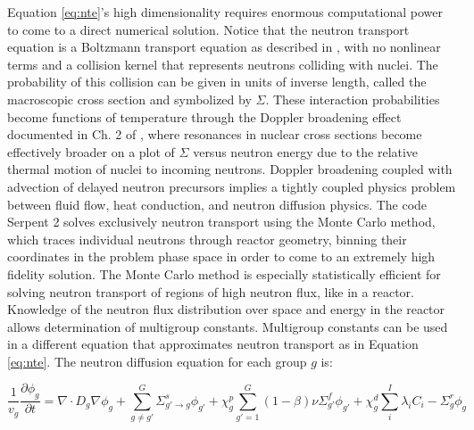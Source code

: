 \documentclass[12pt]{article}
\begin{document}
Equation \ref{eq:nte}'s high dimensionality requires enormous computational power to come to a direct numerical solution. Notice that the neutron transport equation is a Boltzmann transport equation as described in \cite{boltzmann_lectures_2011}, with no nonlinear terms and a collision kernel that represents neutrons colliding with nuclei. The probability of this collision can be given in units of inverse length, called the macroscopic cross section and symbolized by $\Sigma$. These interaction probabilities become functions of temperature through the Doppler broadening effect documented in Ch. 2 of \cite{duderstadt_nuclear_1976}, where resonances in nuclear cross sections become effectively broader on a plot of $\Sigma$ versus neutron energy due to the relative thermal motion of nuclei to incoming neutrons. Doppler broadening coupled with advection of delayed neutron precursors implies a tightly coupled physics problem between fluid flow, heat conduction, and neutron diffusion physics. The code Serpent 2 solves exclusively neutron transport using the Monte Carlo method, which traces individual neutrons through reactor geometry, binning their coordinates in the problem phase space in order to come to an extremely high fidelity solution. The Monte Carlo method is especially statistically efficient for solving neutron transport of regions of high neutron flux, like in a reactor. Knowledge of the neutron flux distribution over space and energy in the reactor allows determination of multigroup constants. Multigroup constants can be used in a different equation that approximates neutron transport as in Equation \ref{eq:nte}. The neutron diffusion equation for each group $g$ is:

\begin{equation}                \frac{1}{v_g}\frac{\partial {\phi}_g}{\partial t}   = \nabla \cdot D_g
                \nabla {\phi}_g +
                \sum_{g \ne g'}^G
                {\Sigma_{g'\rightarrow g}^s} {\phi}_{g'} + \chi_g^p \sum_{g' = 1}^G (1 -
                \beta) \nu {\Sigma_{g'}^f} {\phi}_{g'} + \chi_g^d \sum_i^I 
                \lambda_i {C_i} - {\Sigma_g^r} {\phi_g}
\label{eq:diff}
\end{equation}
\end{document}
